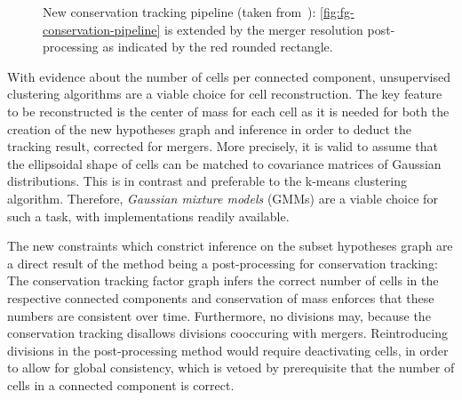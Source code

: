 \begin{figure}
    \centering
    \caption[Conservation tracking pipeline including merger resolution]{New conservation tracking
        pipeline (taken from~\cite{schiegg_13_conservation}): \cref{fig:fg-conservation-pipeline} is
    extended by the merger resolution post-processing as indicated by the red rounded rectangle.}
\label{fig:gmm-pipeline}
\end{figure}

With evidence about the number of cells per connected component, unsupervised clustering algorithms
are a viable choice for cell reconstruction. The key feature to be reconstructed is the center of
mass for each cell as it is needed for both the creation of the new hypotheses graph and inference
in order to deduct the tracking result, corrected for mergers. More precisely, it is valid to assume
that the ellipsoidal shape of cells can be matched to covariance matrices of Gaussian
distributions. This is in contrast and preferable to the k-means clustering
algorithm\citep{macqueen_67_methods}. Therefore, \emph{Gaussian mixture models} (GMMs) are a viable
choice for such a task, with implementations readily available.

The new constraints which constrict inference on the subset hypotheses graph are a direct result of
the method being a post-processing for conservation tracking: The conservation tracking factor graph
infers the correct number of cells in the respective connected components and conservation of mass
enforces that these numbers are consistent over time. Furthermore, no divisions may, because the
conservation tracking disallows divisions cooccuring with mergers. Reintroducing divisions in the
post-processing method would require deactivating cells, in order to allow for global consistency,
which is vetoed by prerequisite that the number of cells in a connected component is correct.

